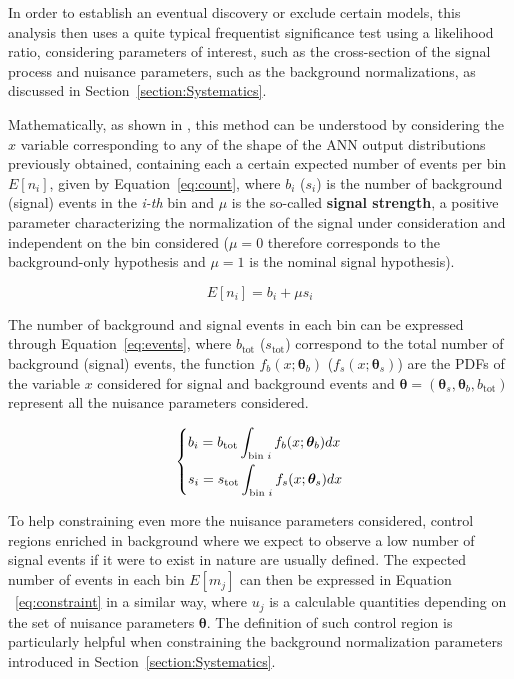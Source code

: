 \documentclass[a4paper, 10pt, openright]{report}
\begin{document}
In order to establish an eventual discovery or exclude certain models, this analysis then uses a quite typical frequentist significance test using a likelihood ratio, considering parameters of interest, such as the cross-section of the signal process and nuisance parameters, such as the background normalizations, as discussed in Section~\ref{section:Systematics}. 

Mathematically, as shown in \cite{asymptotic}, this method can be understood by considering the $x$ variable corresponding to any of the shape of the \ac{ANN} output distributions previously obtained, containing each a certain expected number of events per bin $E[n_i]$, given by Equation~\ref{eq:count}, where $b_i$ ($s_i$) is the number of background (signal) events in the \textit{i-th} bin and $\mu$ is the so-called \textbf{signal strength}, a positive parameter characterizing the normalization of the signal under consideration and independent on the bin considered ($\mu = 0$ therefore corresponds to the background-only hypothesis and $\mu = 1$ is the nominal signal hypothesis).

\begin{equation}
\label{eq:count}
E[n_i] = b_i + \mu s_i
\end{equation}

The number of background and signal events in each bin can be expressed through Equation~\ref{eq:events}, where $b_{\text{tot}}$ ($s_{\text{tot}}$) correspond to the total number of background (signal) events, the function $f_b(x;\bm \theta_b)$ ($f_s(x;\bm \theta_s)$) are the \acp{PDF} of the variable $x$ considered for signal and background events and $\bm \theta = (\bm \theta_s, \bm \theta_b, b_\text{tot})$ represent all the nuisance parameters considered.

\begin{equation}
\label{eq:events}
\begin{dcases}
b_i = b_{\text{tot}} \int_{\text{bin }i} f_b(x;\bm \theta_b)dx \\
s_i = s_{\text{tot}} \int_{\text{bin }i} f_s(x;\bm \theta_s)dx
\end{dcases}
\end{equation}

To help constraining even more the nuisance parameters considered, control regions enriched in background where we expect to observe a low number of signal events if it were to exist in nature are usually defined. The expected number of events in each bin $E[m_j]$ can then be expressed in Equation ~\ref{eq:constraint} in a similar way, where $u_j$ is a calculable quantities depending on the set of nuisance parameters $\bm \theta$. The definition of such control region is particularly helpful when constraining the background normalization parameters introduced in Section~\ref{section:Systematics}.
\end{document}
